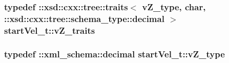 \hypertarget{classstartVel__t_ad5aed7020c09d4d3eea549d4f2b34aa4}{
\subsubsection[{v\-Z\-\_\-traits}]{\setlength{\rightskip}{0pt plus 5cm}typedef \-::xsd\-::cxx\-::tree\-::traits$<$ {\bf v\-Z\-\_\-type}, char, \-::xsd\-::cxx\-::tree\-::schema\-\_\-type\-::decimal $>$ {\bf start\-Vel\-\_\-t\-::v\-Z\-\_\-traits}}}\label{classstartVel__t_ad5aed7020c09d4d3eea549d4f2b34aa4}
\hypertarget{classstartVel__t_ae5f77efcbc29e3290d1f36cb89fbd2bf}{
\subsubsection[{v\-Z\-\_\-type}]{\setlength{\rightskip}{0pt plus 5cm}typedef \-::{\bf xml\-\_\-schema\-::decimal} {\bf start\-Vel\-\_\-t\-::v\-Z\-\_\-type}}}\label{classstartVel__t_ae5f77efcbc29e3290d1f36cb89fbd2bf}


